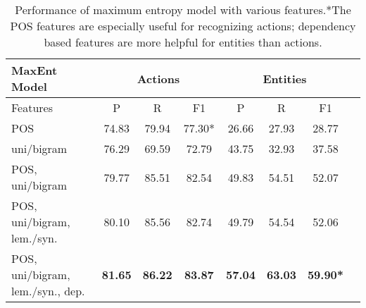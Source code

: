 \documentclass[11pt,a4paper]{article}
\begin{document}
\begin{table*}[ht]
\small
\begin{center}
\begin{tabular}{ |l||c|c|c|c|c|c|c|  }
 \hline
    MaxEnt Model                 &  \multicolumn{3}{c|}{Actions} & \multicolumn{3}{c|}{Entities} \\
\hline
    Features        & P     & R     & F1       & P      & R      & F1     \\
\hline

POS                     & 74.83 & 79.94 & 77.30*     & 26.66  & 27.93  & 28.77  \\
uni/bigram                  & 76.29 & 69.59 & 72.79     & 43.75  & 32.93  & 37.58 \\
POS, uni/bigram              & 79.77 & 85.51 & 82.54     & 49.83  & 54.51  & 52.07 \\
POS, uni/bigram, lem./syn.   & 80.10 & 85.56 & 82.74     & 49.79  &54.54   & 52.06  \\
POS, uni/bigram, lem./syn., dep.            & \bf{81.65} & \bf{86.22} & \bf{83.87}     &  \bf{57.04}  &  \bf{63.03}  & \bf{59.90}*  \\

 \hline
\end{tabular}
\end{center}
\caption{Performance of  maximum entropy model with various features.*The POS features are especially useful for recognizing actions; dependency based features are more helpful for entities than actions.}
    \label{table:maxent}
\end{table*}
\end{document}
